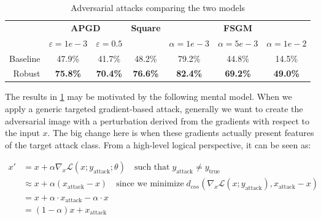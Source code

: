 \documentclass[../thesis.tex]{subfiles}
\begin{document}
\begin{table}[ht]
\begin{tabular}{lcclccc}
\toprule
                             & \multicolumn{2}{c}{\textbf{APGD}}          & \textbf{Square}                     & \multicolumn{3}{c}{\textbf{FSGM}}                                                                               \\
                             & $\varepsilon = 1e-3$ & $\varepsilon = 0.5$ &                                     & \multicolumn{1}{l}{$\alpha = 1e-3$} & \multicolumn{1}{l}{$\alpha = 5e-3$} & \multicolumn{1}{l}{$\alpha = 1e-2$} \\
 \midrule
\multicolumn{1}{r}{Baseline} & 47.9\%               & 41.7\%              & \multicolumn{1}{c}{48.2\%}          & 79.2\%                              & 44.8\%                              & 14.5\%                              \\
\multicolumn{1}{r}{Robust}   & \textbf{75.8\%}      & \textbf{70.4\%}     & \multicolumn{1}{c}{\textbf{76.6\%}} & \textbf{82.4\%}                     & \textbf{69.2\%}                     & \textbf{49.0\%}                    \\
\bottomrule
\end{tabular}
\vspace{0.25cm}
\caption{Adversarial attacks comparing the two models}
\label{table:pag__binary_classifier_robustness}
\end{table}

The results in \cref{table:pag__binary_classifier_robustness} may be motivated by the following mental model.
When we apply a generic targeted gradient-based attack, generally we want to create the adversarial image with a perturbation derived from the gradients with respect to the input $x$.
The big change here is when these gradients actually present features of the target attack class.
From a high-level logical perspective, it can be seen as:

\begin{equation}
\begin{split}
    x' & = x + \alpha \nabla_x \mathcal{L}(x; y_\text{attack}; \theta) \quad \text{such that}\; y_\text{attack} \neq y_\text{true} \\
       & \approx x + \alpha (x_\text{attack} - x) \quad \text{since we minimize} \; d_{cos}(\nabla_x\mathcal{L}(x; y_\text{attack}), x_\text{attack} - x) \\
       &= x + \alpha \cdot x_\text{attack} - \alpha \cdot x \\
       &= (1 - \alpha) x + x_\text{attack}
\end{split}
\end{equation}
\end{document}
